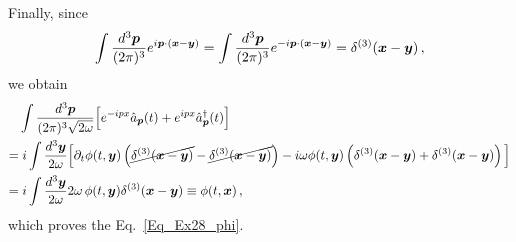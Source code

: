 \begin{sol}
    Finally, since 
    \begin{equation}
        \int \frac{d^3 \boldsymbol{p}}{(2\pi)^3} e^{i\boldsymbol{p} \cdot(\boldsymbol{x} - \boldsymbol{y})} = \int \frac{d^3 \boldsymbol{p}}{(2\pi)^3} e^{-i\boldsymbol{p} \cdot(\boldsymbol{x} - \boldsymbol{y})} = \delta^{(3)}(\boldsymbol{x} - \boldsymbol{y}) \, ,
    \end{equation}
    we obtain 
    \begin{equation}
    \begin{split}
        & \int \frac{d^3 \boldsymbol{p}}{(2\pi)^3 \sqrt{2\omega}} \Big[e^{-ipx} \hat{a}_{\boldsymbol{p}}(t) + e^{ipx} \hat{a}^\dagger_{\boldsymbol{p}}(t)\Big] \\
        = &\; i \int \frac{d^3 \boldsymbol{y}}{2\omega} \Big[\partial_t  \phi(t,\boldsymbol{y}) \left(\cancel{\delta^{(3)}(\boldsymbol{x} - \boldsymbol{y})} - \cancel{\delta^{(3)}(\boldsymbol{x} - \boldsymbol{y})}\right) - i\omega \phi(t,\boldsymbol{y}) \left(\delta^{(3)}(\boldsymbol{x} - \boldsymbol{y}) + \delta^{(3)}(\boldsymbol{x} - \boldsymbol{y})\right) \Big] \\
        = &\; i \int \frac{d^3 \boldsymbol{y}}{2\omega} 2\omega \, \phi(t,\boldsymbol{y}) \delta^{(3)}(\boldsymbol{x} - \boldsymbol{y}) \equiv \phi(t,\boldsymbol{x}) \, ,
    \end{split}
    \end{equation}
    which proves the Eq.~\eqref{Eq_Ex28_phi}.
\end{sol}
